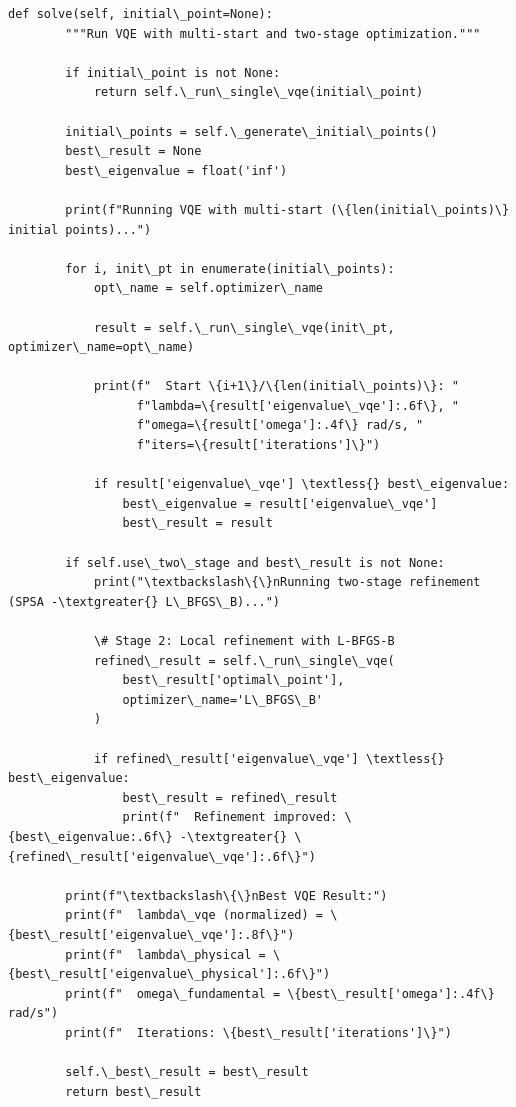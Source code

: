\documentclass[12pt, a4paper]{article}
\begin{document}
\begin{lstlisting}[style=codestyle, caption={{vqe_runner.py --- VQE Solver}}]
    def solve(self, initial\_point=None):
        """Run VQE with multi-start and two-stage optimization."""

        if initial\_point is not None:
            return self.\_run\_single\_vqe(initial\_point)

        initial\_points = self.\_generate\_initial\_points()
        best\_result = None
        best\_eigenvalue = float('inf')

        print(f"Running VQE with multi-start (\{len(initial\_points)\} initial points)...")
        
        for i, init\_pt in enumerate(initial\_points):
            opt\_name = self.optimizer\_name
            
            result = self.\_run\_single\_vqe(init\_pt, optimizer\_name=opt\_name)
            
            print(f"  Start \{i+1\}/\{len(initial\_points)\}: "
                  f"lambda=\{result['eigenvalue\_vqe']:.6f\}, "
                  f"omega=\{result['omega']:.4f\} rad/s, "
                  f"iters=\{result['iterations']\}")
            
            if result['eigenvalue\_vqe'] \textless{} best\_eigenvalue:
                best\_eigenvalue = result['eigenvalue\_vqe']
                best\_result = result

        if self.use\_two\_stage and best\_result is not None:
            print("\textbackslash\{\}nRunning two-stage refinement (SPSA -\textgreater{} L\_BFGS\_B)...")
            
            \# Stage 2: Local refinement with L-BFGS-B
            refined\_result = self.\_run\_single\_vqe(
                best\_result['optimal\_point'],
                optimizer\_name='L\_BFGS\_B'
            )
            
            if refined\_result['eigenvalue\_vqe'] \textless{} best\_eigenvalue:
                best\_result = refined\_result
                print(f"  Refinement improved: \{best\_eigenvalue:.6f\} -\textgreater{} \{refined\_result['eigenvalue\_vqe']:.6f\}")

        print(f"\textbackslash\{\}nBest VQE Result:")
        print(f"  lambda\_vqe (normalized) = \{best\_result['eigenvalue\_vqe']:.8f\}")
        print(f"  lambda\_physical = \{best\_result['eigenvalue\_physical']:.6f\}")
        print(f"  omega\_fundamental = \{best\_result['omega']:.4f\} rad/s")
        print(f"  Iterations: \{best\_result['iterations']\}")

        self.\_best\_result = best\_result
        return best\_result


\end{lstlisting}
\end{document}
